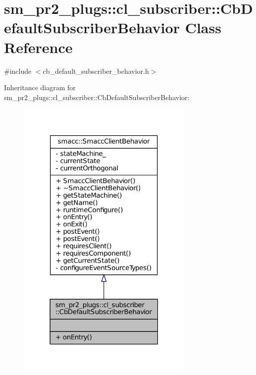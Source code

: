 \hypertarget{classsm__pr2__plugs_1_1cl__subscriber_1_1CbDefaultSubscriberBehavior}{}\section{sm\+\_\+pr2\+\_\+plugs\+:\+:cl\+\_\+subscriber\+:\+:Cb\+Default\+Subscriber\+Behavior Class Reference}
\label{classsm__pr2__plugs_1_1cl__subscriber_1_1CbDefaultSubscriberBehavior}


{\ttfamily \#include $<$cb\+\_\+default\+\_\+subscriber\+\_\+behavior.\+h$>$}



Inheritance diagram for sm\+\_\+pr2\+\_\+plugs\+:\+:cl\+\_\+subscriber\+:\+:Cb\+Default\+Subscriber\+Behavior\+:
\nopagebreak
\begin{figure}[H]
\begin{center}
\leavevmode
\includegraphics[width=243pt]{classsm__pr2__plugs_1_1cl__subscriber_1_1CbDefaultSubscriberBehavior__inherit__graph}
\end{center}
\end{figure}


